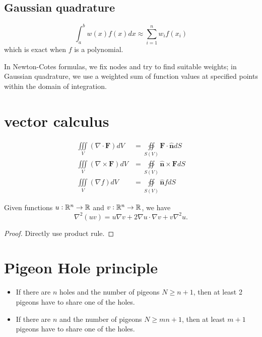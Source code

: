 \begin{refsection}
\subsection{Gaussian quadrature}

$$\int_a^b w(x)f(x)dx \approx \sum_{i=1}^n w_i f(x_i)$$
which is exact when $f$ is a polynomial.

\begin{remark}
In Newton-Cotes formulas, we fix nodes and try to find suitable weights; in Gaussian quadrature, we use a weighted sum of function values at specified points within the domain of integration.
\end{remark}

\section{vector calculus}
\begin{lemma}\label{appendix:th:divergencetheorem}
	\begin{align*}
	\iiint\limits_V(\nabla \cdot \mathbf{F}) dV
	& = \oiint \limits_{S(V)} \mathbf{F \cdot \hat{n}} dS \\      \iiint\limits_V(\nabla \times \mathbf{F}) dV
	& = \oiint \limits_{S(V)} \mathbf{\hat{n} \times F} dS \\      \iiint\limits_V(\nabla f) dV
	& = \oiint\limits_{S(V)}\mathbf{\hat{n}}f dS
	\end{align*}
\end{lemma}


\begin{lemma}
Given functions $u: \mathbb{R}^n\to \mathbb{R}$ and $v:\mathbb{R}^n \to \mathbb{R}$, we have 
	$$\nabla^2 (uv) = u\nabla v + 2\nabla u \cdot \nabla v + v\nabla^2 u.$$
\end{lemma}
\begin{proof}
Directly use product rule. 
\end{proof}



\section{Pigeon Hole principle}
\begin{lemma}\hfill
\begin{itemize}
	\item If there are $n$ holes and the number of pigeons $N \geq n+1$, then at least 2 pigeons have to share one of the holes.
	\item If there are $n$ and the number of pigeons $N \geq mn+1$, then at least $m+1$ pigeons have to share one of the holes.
\end{itemize}
\end{lemma}




\end{refsection}
